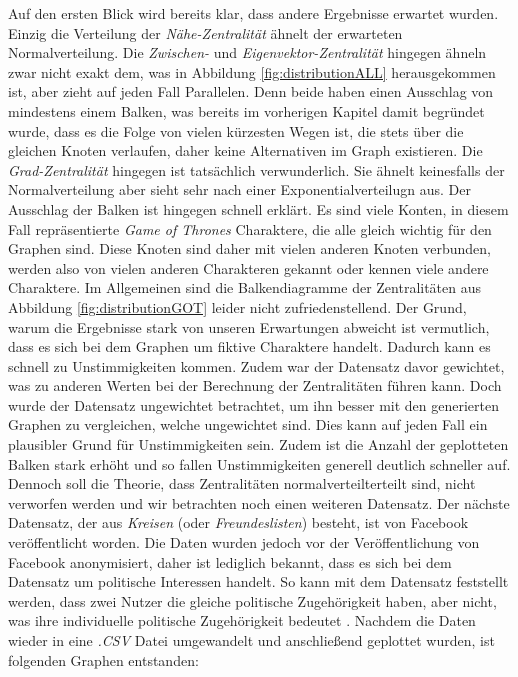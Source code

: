  Auf den ersten Blick wird bereits klar, dass andere Ergebnisse erwartet wurden. Einzig die Verteilung der \textit{Nähe-Zentralität} ähnelt der erwarteten Normalverteilung. Die \textit{Zwischen-} und \textit{Eigenvektor-Zentralität} hingegen ähneln zwar nicht exakt dem, was in Abbildung \ref{fig:distributionALL} herausgekommen ist, aber zieht auf jeden Fall Parallelen. Denn beide haben einen Ausschlag von mindestens einem Balken, was bereits im vorherigen Kapitel damit begründet wurde, dass es die Folge von vielen kürzesten Wegen ist, die stets über die gleichen
Knoten verlaufen, daher keine Alternativen im Graph existieren. Die \textit{Grad-Zentralität} hingegen ist tatsächlich verwunderlich. Sie ähnelt keinesfalls der Normalverteilung aber sieht sehr nach einer Exponentialverteilugn aus. Der Ausschlag der Balken ist hingegen schnell erklärt. Es sind viele Konten, in diesem Fall repräsentierte \textit{Game of Thrones} Charaktere, die alle gleich wichtig für den Graphen sind. Diese Knoten sind daher mit vielen anderen Knoten verbunden, werden also von vielen anderen Charakteren gekannt oder kennen viele andere Charaktere. Im Allgemeinen sind die Balkendiagramme der Zentralitäten aus Abbildung \ref{fig:distributionGOT} leider nicht zufriedenstellend. Der Grund, warum die Ergebnisse stark von unseren Erwartungen abweicht ist vermutlich, dass es sich bei dem Graphen um fiktive Charaktere handelt. Dadurch kann es schnell zu Unstimmigkeiten kommen. Zudem war der Datensatz davor gewichtet, was zu anderen Werten bei der Berechnung der Zentralitäten führen kann. Doch wurde der Datensatz ungewichtet betrachtet, um ihn besser mit den generierten Graphen zu vergleichen, welche ungewichtet sind. Dies kann auf jeden Fall ein plausibler Grund für Unstimmigkeiten sein. Zudem ist die Anzahl der geplotteten Balken stark erhöht und so fallen Unstimmigkeiten generell deutlich schneller auf. Dennoch soll die Theorie, dass Zentralitäten normalverteilterteilt sind, nicht verworfen werden und wir betrachten noch einen weiteren Datensatz. Der nächste Datensatz, der aus \textit{Kreisen} (oder \textit{Freundeslisten}) besteht, ist von Facebook veröffentlicht worden. Die Daten wurden jedoch vor der Veröffentlichung von Facebook anonymisiert, daher ist lediglich bekannt, dass es sich bei dem Datensatz um politische Interessen handelt. So kann mit dem Datensatz feststellt werden, dass zwei Nutzer die gleiche politische Zugehörigkeit haben, aber nicht, was ihre individuelle politische Zugehörigkeit bedeutet \cite{FBData}.
Nachdem die Daten wieder in eine \textit{.CSV} Datei umgewandelt und anschließend geplottet wurden, ist folgenden Graphen entstanden: 


